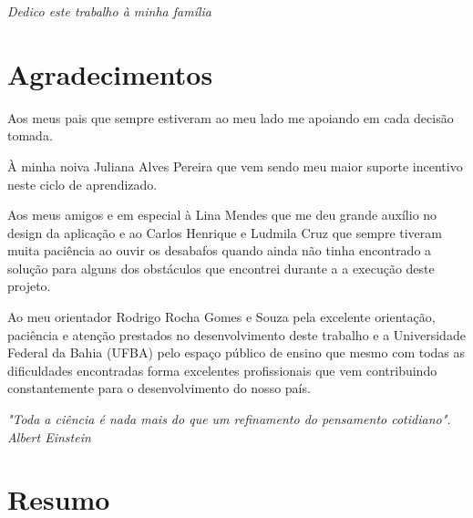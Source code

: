 \documentclass[12pt, a4paper]{report}
\begin{document}
\newpage
\vspace*{21cm}
\begin{flushright}
\textit{Dedico este trabalho à minha família}
\end{flushright}


\newpage
\chapter*{Agradecimentos}
\thispagestyle{empty}
Aos meus pais que sempre estiveram ao meu lado me apoiando em cada decisão tomada.

À minha noiva Juliana Alves Pereira que vem sendo meu maior suporte incentivo neste ciclo de aprendizado. 

Aos meus amigos e em especial à Lina Mendes que me deu grande auxílio no design da aplicação e ao Carlos Henrique e Ludmila Cruz que sempre tiveram muita paciência ao ouvir os desabafos quando ainda não tinha encontrado a solução para alguns dos obstáculos que encontrei durante a a execução deste projeto. 

Ao meu orientador Rodrigo Rocha Gomes e Souza pela excelente orientação, paciência e atenção prestados no desenvolvimento deste trabalho e a Universidade Federal da Bahia (UFBA) pelo espaço público de ensino que mesmo com todas as dificuldades encontradas forma excelentes profissionais que vem contribuindo constantemente para o desenvolvimento do nosso país.  

\newpage
\vspace*{20cm}
\begin{flushright}
\begin{minipage}{8cm}
\begin{flushright}
\textit{
"Toda a ciência é nada mais do que um refinamento do pensamento cotidiano". \\
Albert Einstein}
\end{flushright}
\end{minipage}
\end{flushright}


\newpage
\chapter*{Resumo}
\thispagestyle{empty}
 


\newpage
\end{document}
